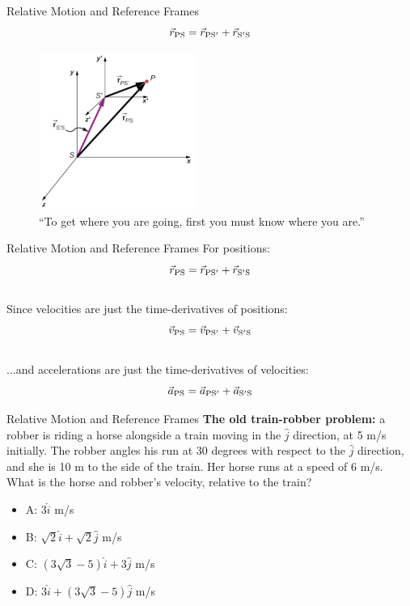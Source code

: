 \documentclass{beamer}
\begin{document}
\begin{frame}{Relative Motion and Reference Frames}
\small
\begin{equation}
\vec{r}_{\rm PS} = \vec{r}_{\rm PS'} + \vec{r}_{\rm S'S}
\end{equation}
\begin{figure}
\centering
\includegraphics[width=0.45\textwidth]{figures/frames.png}
\caption{\label{fig:frame} \small ``To get where you are going, first you must know where you are.''}
\end{figure}
\end{frame}

\begin{frame}{Relative Motion and Reference Frames}
For positions:
\begin{equation}
\vec{r}_{\rm PS} = \vec{r}_{\rm PS'} + \vec{r}_{\rm S'S}
\end{equation}\\
Since velocities are just the time-derivatives of positions:
\begin{equation}
\vec{v}_{\rm PS} = \vec{v}_{\rm PS'} + \vec{v}_{\rm S'S}
\end{equation}\\
...and accelerations are just the time-derivatives of velocities:
\begin{equation}
\vec{a}_{\rm PS} = \vec{a}_{\rm PS'} + \vec{a}_{\rm S'S}
\end{equation}
\end{frame}

\begin{frame}{Relative Motion and Reference Frames}
\small 
\textbf{The old train-robber problem:} a robber is riding a horse alongside a train moving in the $\hat{j}$ direction, at 5 m/s initially.  The robber angles his run at 30 degrees with respect to the $\hat{j}$ direction, and she is 10 m to the side of the train.  Her horse runs at a speed of 6 m/s.  What is the horse and robber's velocity, relative to the train?\\
\begin{itemize}
\item A: $3\hat{i}$ m/s
\item B: $\sqrt{2}\hat{i} + \sqrt{2}\hat{j}$ m/s
\item C: $(3\sqrt{3}-5)\hat{i} + 3\hat{j}$  m/s
\item D: $3\hat{i} + (3\sqrt{3}-5)\hat{j}$  m/s
\end{itemize}
\end{frame}
\end{document}
